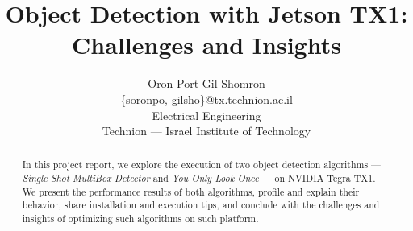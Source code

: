 \documentclass{sig-alternate}
\title{Object Detection with Jetson TX1:\\Challenges and Insights}
\author{
  {
  Oron Port\hspace{10 mm}
  Gil Shomron}\\[0mm]
  \{soronpo, gilsho\}@tx.technion.ac.il\\[0mm]
  Electrical Engineering\\[0mm]
  Technion --- Israel Institute of Technology
}
\begin{document}
\maketitle
\thispagestyle{firstpage}
\pagestyle{plain}




\begin{abstract}

In this project report, we explore the execution of two object detection algorithms --- \textit{Single Shot MultiBox Detector} and \textit{You Only Look Once} --- on NVIDIA Tegra TX1. We present the performance results of both algorithms, profile and explain their behavior, share installation and execution tips, and conclude with the challenges and insights of optimizing such algorithms on such platform.

\end{abstract}














\end{document}
